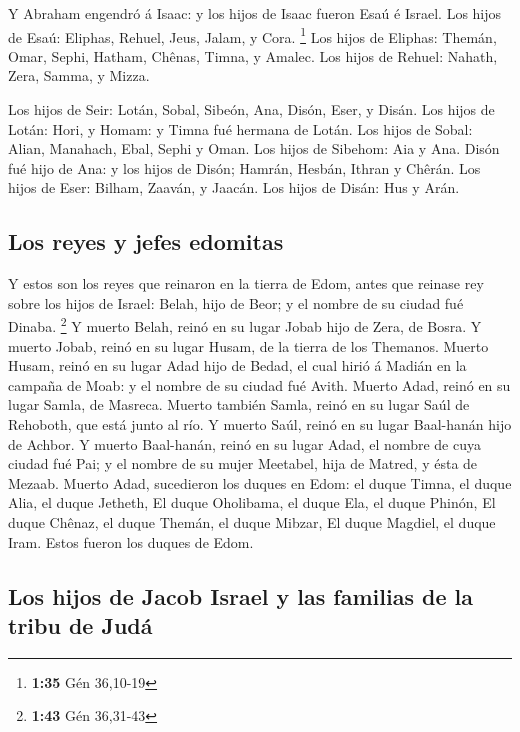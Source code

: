 Y Abraham engendró á Isaac: y los hijos de Isaac fueron
Esaú é Israel.  Los hijos de Esaú: Eliphas, Rehuel, Jeus,
Jalam, y Cora. \footnote{\textbf{1:35} Gén 36,10-19}  Los
hijos de Eliphas: Themán, Omar, Sephi, Hatham, Chênas, Timna, y Amalec.
 Los hijos de Rehuel: Nahath, Zera, Samma, y Mizza.

 Los hijos de Seir: Lotán, Sobal, Sibeón, Ana, Disón, Eser,
y Disán.  Los hijos de Lotán: Hori, y Homam: y Timna fué
hermana de Lotán.  Los hijos de Sobal: Alian, Manahach,
Ebal, Sephi y Oman. Los hijos de Sibehom: Aia y Ana.  Disón
fué hijo de Ana: y los hijos de Disón; Hamrán, Hesbán, Ithran y Chêrán.
 Los hijos de Eser: Bilham, Zaaván, y Jaacán. Los hijos de
Disán: Hus y Arán.

\hypertarget{los-reyes-y-jefes-edomitas}{%
\subsection{Los reyes y jefes
edomitas}\label{los-reyes-y-jefes-edomitas}}

 Y estos son los reyes que reinaron en la tierra de Edom,
antes que reinase rey sobre los hijos de Israel: Belah, hijo de Beor; y
el nombre de su ciudad fué Dinaba. \footnote{\textbf{1:43} Gén 36,31-43}
 Y muerto Belah, reinó en su lugar Jobab hijo de Zera, de
Bosra.  Y muerto Jobab, reinó en su lugar Husam, de la
tierra de los Themanos.  Muerto Husam, reinó en su lugar
Adad hijo de Bedad, el cual hirió á Madián en la campaña de Moab: y el
nombre de su ciudad fué Avith.  Muerto Adad, reinó en su
lugar Samla, de Masreca.  Muerto también Samla, reinó en su
lugar Saúl de Rehoboth, que está junto al río.  Y muerto
Saúl, reinó en su lugar Baal-hanán hijo de Achbor.  Y
muerto Baal-hanán, reinó en su lugar Adad, el nombre de cuya ciudad fué
Pai; y el nombre de su mujer Meetabel, hija de Matred, y ésta de Mezaab.
 Muerto Adad, sucedieron los duques en Edom: el duque
Timna, el duque Alia, el duque Jetheth,  El duque
Oholibama, el duque Ela, el duque Phinón,  El duque Chênaz,
el duque Themán, el duque Mibzar,  El duque Magdiel, el
duque Iram. Estos fueron los duques de Edom.

\hypertarget{los-hijos-de-jacob-israel-y-las-familias-de-la-tribu-de-juduxe1}{%
\subsection{Los hijos de Jacob Israel y las familias de la tribu de
Judá}\label{los-hijos-de-jacob-israel-y-las-familias-de-la-tribu-de-juduxe1}}

